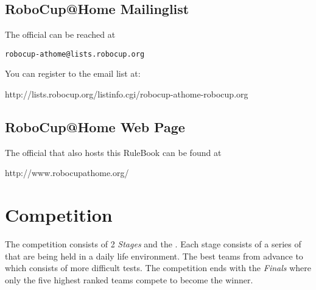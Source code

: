 \subsection{RoboCup@Home Mailinglist}
The official  can be reached at
\begin{center}
\texttt{robocup-athome@lists.robocup.org}
\end{center}
You can register to the email list at:
\begin{center}
http://lists.robocup.org/listinfo.cgi/robocup-athome-robocup.org
\end{center}

\subsection{RoboCup@Home Web Page}
The official  that also hosts this RuleBook can be found at \\
\begin{center}
http://www.robocupathome.org/
\end{center}


\section{Competition}
The competition consists of 2 \emph{Stages} and the . Each stage consists of a series of  that are being held in a daily life environment. The best teams from  advance to  which consists of more difficult tests. The competition ends with the \emph{Finals} where only the five highest ranked teams compete to become the winner.

